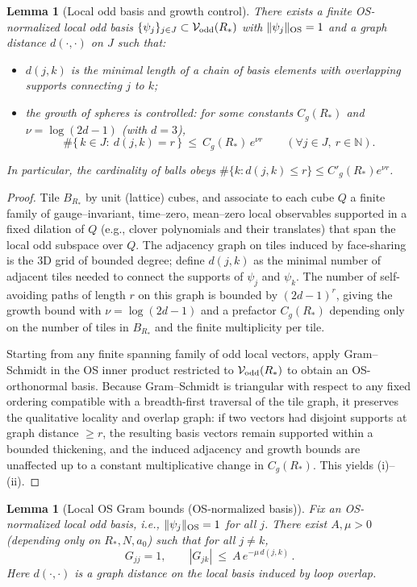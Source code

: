 \documentclass[11pt]{amsart}
\theoremstyle{plain}
\newtheorem{lemma}[theorem]{Lemma}
\theoremstyle{definition}
\theoremstyle{remark}
\begin{document}
\begin{lemma}[Local odd basis and growth control]\label{lem:local-basis-growth}
There exists a finite OS-normalized local odd basis $\{\psi_j\}_{j\in J}\subset \mathcal{V}_{\rm odd}(R_*)$ with $\|\psi_j\|_{\rm OS}=1$ and a graph distance $d(\cdot,\cdot)$ on $J$ such that:
\begin{itemize}
  \item[(i)] $d(j,k)$ is the minimal length of a chain of basis elements with overlapping supports connecting $j$ to $k$;
  \item[(ii)] the growth of spheres is controlled: for some constants $C_g(R_*)$ and $\nu=\log(2d-1)$ (with $d=3$),
  \[
    \#\{\,k\in J:\ d(j,k)=r\,\}\ \le\ C_g(R_*)\,e^{\nu r}\qquad(\forall j\in J,\ r\in\mathbb N).
  \]
\end{itemize}
In particular, the cardinality of balls obeys $\#\{k: d(j,k)\le r\}\le C'_g(R_*) e^{\nu r}$.
\end{lemma}

\begin{proof}
Tile $B_{R_*}$ by unit (lattice) cubes, and associate to each cube $Q$ a finite family of gauge--invariant, time--zero, mean--zero local observables supported in a fixed dilation of $Q$ (e.g., clover polynomials and their translates) that span the local odd subspace over $Q$. The adjacency graph on tiles induced by face-sharing is the 3D grid of bounded degree; define $d(j,k)$ as the minimal number of adjacent tiles needed to connect the supports of $\psi_j$ and $\psi_k$. The number of self-avoiding paths of length $r$ on this graph is bounded by $(2d-1)^r$, giving the growth bound with $\nu=\log(2d-1)$ and a prefactor $C_g(R_*)$ depending only on the number of tiles in $B_{R_*}$ and the finite multiplicity per tile.

Starting from any finite spanning family of odd local vectors, apply Gram--Schmidt in the OS inner product restricted to $\mathcal{V}_{\rm odd}(R_*)$ to obtain an OS-orthonormal basis. Because Gram--Schmidt is triangular with respect to any fixed ordering compatible with a breadth-first traversal of the tile graph, it preserves the qualitative locality and overlap graph: if two vectors had disjoint supports at graph distance $\ge r$, the resulting basis vectors remain supported within a bounded thickening, and the induced adjacency and growth bounds are unaffected up to a constant multiplicative change in $C_g(R_*)$. This yields (i)--(ii).
\end{proof}

\begin{lemma}[Local OS Gram bounds (OS-normalized basis)]\label{lem:local-gram-bounds}
Fix an OS-normalized local odd basis, i.e., $\|\psi_j\|_{\rm OS}=1$ for all $j$. There exist $A,\mu>0$ (depending only on $R_*,N,a_0$) such that for all $j\ne k$,
\[
  G_{jj}=1,\qquad |G_{jk}|\ \le\ A\,e^{-\mu\, d(j,k)}\,.
\]
Here $d(\cdot,\cdot)$ is a graph distance on the local basis induced by loop overlap.
\end{lemma}
\end{document}
